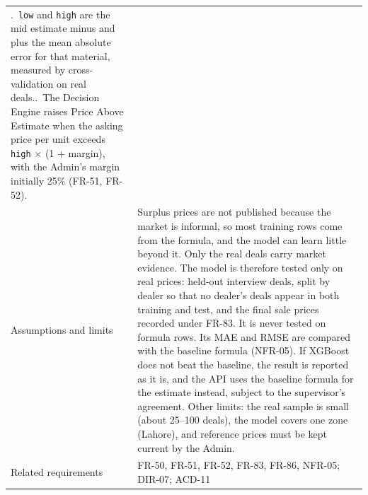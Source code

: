{\begin{longtable}{@{}>{\raggedright\arraybackslash}p{}>{\raggedright\arraybackslash}p{}@{}}
4.~\texttt{low} and \texttt{high} are the mid estimate minus and plus the mean absolute error for that material, measured by cross-validation on real deals.\newline
5.~The Decision Engine raises Price Above Estimate when the asking price per unit exceeds \texttt{high} $\times$ (1 + margin), with the Admin's margin initially 25\% (FR-51, FR-52). \\
Assumptions and limits & Surplus prices are not published because the market is informal, so most training rows come from the formula, and the model can learn little beyond it. Only the real deals carry market evidence. The model is therefore tested only on real prices: held-out interview deals, split by dealer so that no dealer's deals appear in both training and test, and the final sale prices recorded under FR-83. It is never tested on formula rows. Its MAE and RMSE are compared with the baseline formula (NFR-05). If XGBoost does not beat the baseline, the result is reported as it is, and the API uses the baseline formula for the estimate instead, subject to the supervisor's agreement. Other limits: the real sample is small (about 25--100 deals), the model covers one zone (Lahore), and reference prices must be kept current by the Admin. \\
Related requirements & FR-50, FR-51, FR-52, FR-83, FR-86, NFR-05; DIR-07; ACD-11 \\
\bottomrule
\end{longtable}
}

